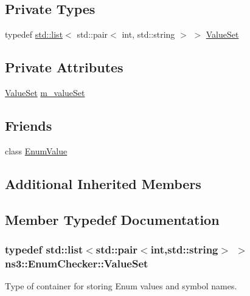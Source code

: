 \subsection*{Private Types}
\begin{DoxyCompactItemize}
\item 
typedef \hyperlink{openflow-interface_8h_afd9bcfa176617760671b67580f536fa7}{std\+::list}$<$ std\+::pair$<$ int, std\+::string $>$ $>$ \hyperlink{classns3_1_1EnumChecker_a65f2f9a14235e9c74377e0be2b20c927}{Value\+Set}
\end{DoxyCompactItemize}
\subsection*{Private Attributes}
\begin{DoxyCompactItemize}
\item 
\hyperlink{classns3_1_1EnumChecker_a65f2f9a14235e9c74377e0be2b20c927}{Value\+Set} \hyperlink{classns3_1_1EnumChecker_a4e9e5c4eea23237a0001c8dcb0f1cf76}{m\+\_\+value\+Set}
\end{DoxyCompactItemize}
\subsection*{Friends}
\begin{DoxyCompactItemize}
\item 
class \hyperlink{classns3_1_1EnumChecker_a5565403536e77f1cb3db26a8ba9b1b07}{Enum\+Value}
\end{DoxyCompactItemize}
\subsection*{Additional Inherited Members}


\subsection{Member Typedef Documentation}
\subsubsection[{\texorpdfstring{Value\+Set}{ValueSet}}]{\setlength{\rightskip}{0pt plus 5cm}typedef {\bf std\+::list}$<$std\+::pair$<$int,std\+::string$>$ $>$ {\bf ns3\+::\+Enum\+Checker\+::\+Value\+Set}\hspace{0.3cm}{\ttfamily [private]}}\hypertarget{classns3_1_1EnumChecker_a65f2f9a14235e9c74377e0be2b20c927}{}\label{classns3_1_1EnumChecker_a65f2f9a14235e9c74377e0be2b20c927}
Type of container for storing Enum values and symbol names. 

